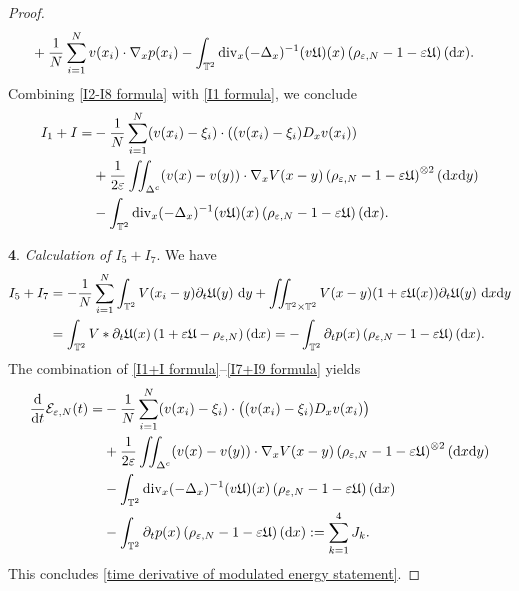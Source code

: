 \documentclass[11pt,reqno]{amsart}
\numberwithin{equation}{section}
\def\dd{{\rm d}}
\begin{document}
\begin{proof}
\begin{align}
&+\frac{1}{N}\sum_{i=1}^{N}v(x_{i})\cdot \nabla_{x} p(x_{i})-\int_{\mathbb{T}^{2}} \mathrm{div}_{x} (-\Delta_{x})^{-1}(v\mathfrak{U})(x)\left(\rho_{\varepsilon,N}-1-\varepsilon\mathfrak{U}\right)(\dd x). \label{I1 formula}
\end{align}
Combining \eqref{I2-I8 formula} with \eqref{I1 formula}, we conclude  
\begin{align}
I_{1}+I=&-\frac{1}{N}\sum_{i=1}^{N}(v(x_{i})-\xi_{i})\cdot((v(x_{i})-\xi_{i})D_{x}v(x_{i}))
\notag\\
&+\frac{1}{2\varepsilon}\iint_{\Delta^{c}}(v(x)-v(y))\cdot \nabla_{x} V(x-y)\left(\rho_{\varepsilon,N}-1-\varepsilon \mathfrak{U}\right)^{\otimes 2}(\dd x\dd y) \notag \notag\\
&-\int_{\mathbb{T}^{2}} \mathrm{div}_{x} (-\Delta_{x})^{-1}(v\mathfrak{U})(x)\left(\rho_{\varepsilon,N}-1-\varepsilon\mathfrak{U}\right)(\dd x). \label{I1+I formula}
\end{align}

\smallskip
\textbf{4}. \textit{Calculation of $I_{5}+I_{7}$}. 
We have 
\begin{align}
I_{5}+I_{7}&=-\frac{1}{N}\sum_{i=1}^{N}\int_{\mathbb{T}^{2}} V(x_{i}-y)\partial_{t}\mathfrak{U}(y)\ \dd y +\iint_{\mathbb{T}^{2}\times \mathbb{T}^{2}} V(x-y)(1+\varepsilon \mathfrak{U}(x))\partial_{t}\mathfrak{U}(y)\ \dd x\dd y\notag\\
&= \int_{\mathbb{T}^{2}} V\ast \partial_{t}\mathfrak{U}(x)\left(1+\varepsilon\mathfrak{U}-\rho_{\varepsilon,N}\right)(\dd x)=-\int_{\mathbb{T}^{2}}\partial_{t}p(x)\left(\rho_{\varepsilon,N}-1-\varepsilon\mathfrak{U}\right)(\dd x). \label{I7+I9 formula}
\end{align}
The combination of \eqref{I1+I formula}--\eqref{I7+I9 formula} yields 
\begin{align*}
\frac{\dd}{\dd t}\mathcal{E}_{\varepsilon,N}(t)
=& -\frac{1}{N}\sum_{i=1}^{N}(v(x_{i})-\xi_{i})\cdot\big((v(x_{i})-\xi_{i})D_{x}v(x_{i})\big)
\notag\\
&+\frac{1}{2\varepsilon}\iint_{\Delta^{c}}(v(x)-v(y))\cdot \nabla_{x} V(x-y)\left(\rho_{\varepsilon,N}-1-\varepsilon \mathfrak{U}\right)^{\otimes 2}(\dd x\dd y) \notag \notag\\
&-\int_{\mathbb{T}^{2}} \mathrm{div}_{x} (-\Delta_{x})^{-1}(v\mathfrak{U})(x)\left(\rho_{\varepsilon,N}-1-\varepsilon\mathfrak{U}\right)(\dd x)\\
&-\int_{\mathbb{T}^{2}}\partial_{t}p(x)\left(\rho_{\varepsilon,N}-1-\varepsilon\mathfrak{U}\right)(\dd x):= \sum_{k=1}^{4}J_{k}. 
\end{align*}
This concludes \eqref{time derivative of modulated energy statement}.


\end{proof}
\end{document}
